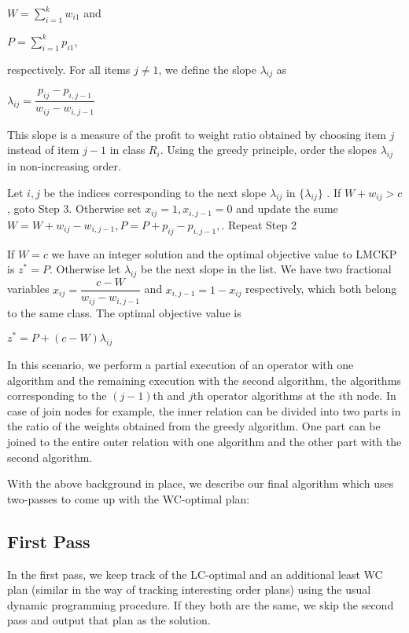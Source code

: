 \documentclass[10pt]{article}
\begin{document}
$W = \sum\limits_{i=1}^{k} w_{i1}$ and 

$P = \sum\limits_{i=1}^{k} p_{i1}$, 

respectively. For all items $j \neq 1$, we define the slope $\lambda_{ij}$ as 

$\lambda_{ij} = \dfrac {p_{ij} - p_{i,j-1} }{w_{ij} - w_{i,j-1}}$

This slope is a measure of the profit to weight ratio obtained by choosing item $j$ instead of item $j-1$ in class $R_i$. Using the greedy principle, order the slopes $\lambda_{ij}$ in non-increasing order.

Let $i,j$ be the indices corresponding to the next slope $\lambda_{ij}$ in $\{\lambda_{ij}\}$ . If $W + w_{ij} > c$, goto Step 3. Otherwise set $x_{ij} = 1, x_{i, j-1} = 0$ and update the sume $W = W + w_{ij} - w_{i,j-1}, P = P + p_{ij} - p_{i,j-1}, $. Repeat Step 2

If $W=c$ we have an integer solution and the optimal objective value to LMCKP is $z^* = P$. Otherwise let $\lambda_{ij}$ be the next slope in the list. We have two fractional variables $x_{ij} = \dfrac {c-W}{w_{ij} - w_{i,j-1}}$ and $x_{i,j-1} = 1 - x_{ij}$ respectively, which both belong to the same class. The optimal objective value is 

$z^* = P + (c-W)\lambda_{ij}$

In this scenario, we perform a partial execution of an operator with one algorithm and the remaining execution with the second algorithm, the algorithms  corresponding to the $(j-1)$th and $j$th operator algorithms at the $i$th node. 
In case of join nodes for example, the inner relation can be divided into two parts in the ratio of the weights obtained from the greedy algorithm. One part can be joined to the entire outer relation with one algorithm and the other part with the second algorithm.

With the above background in place, we describe our final algorithm which uses two-passes to come up with the WC-optimal plan:

\subsection*{First Pass}
In the first pass, we keep track of the LC-optimal and an additional least WC plan (similar in the way of tracking interesting order plans) using the usual dynamic programming procedure. If they both are the same, we skip the second pass and output that plan as the solution.
\end{document}
